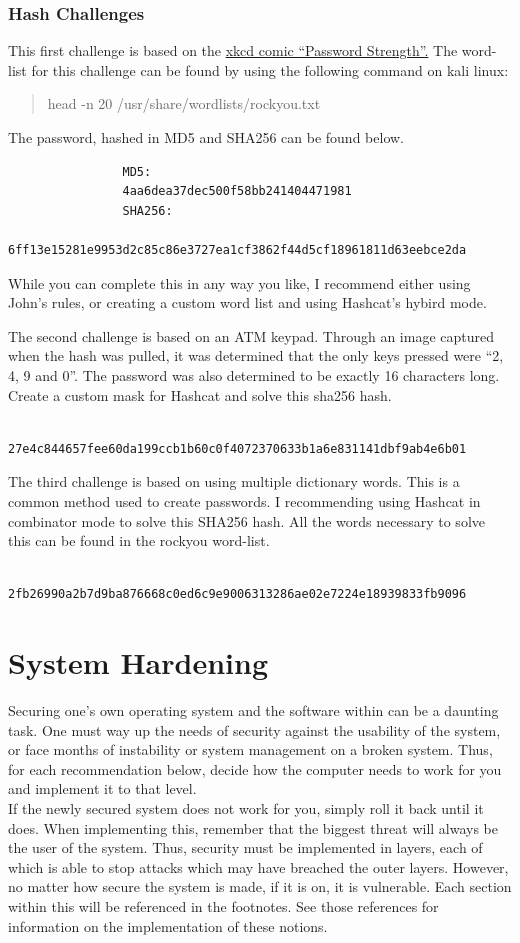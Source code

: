 \documentclass[a4paper,11pt]{report}
\begin{document}
		\subsection{Hash Challenges}
			This first challenge is based on the \href{https://xkcd.com/936/}{xkcd comic ``Password Strength''.}
			The word-list for this challenge can be found by using the following command on kali linux:
			\begin{quote}
				head -n 20 /usr/share/wordlists/rockyou.txt
			\end{quote}
			The password, hashed in MD5 and SHA256 can be found below. 
			\begin{verbatim}
				MD5: 
				4aa6dea37dec500f58bb241404471981
				SHA256: 
				6ff13e15281e9953d2c85c86e3727ea1cf3862f44d5cf18961811d63eebce2da 
			\end{verbatim}
			While you can complete this in any way you like, I recommend either using John's rules, or creating a custom word list and using Hashcat's hybird mode. 

			The second challenge is based on an ATM keypad. 
			Through an image captured when the hash was pulled, it was determined that the only keys pressed were ``2, 4, 9 and 0''. 
			The password was also determined to be exactly 16 characters long. 
			Create a custom mask for Hashcat and solve this sha256 hash. 
			\begin{verbatim}
				27e4c844657fee60da199ccb1b60c0f4072370633b1a6e831141dbf9ab4e6b01
			\end{verbatim}

			The third challenge is based on using multiple dictionary words. 
			This is a common method used to create passwords. 
			I recommending using Hashcat in combinator mode to solve this SHA256 hash. 
			All the words necessary to solve this can be found in the rockyou word-list. 
			\begin{verbatim}
				2fb26990a2b7d9ba876668c0ed6c9e9006313286ae02e7224e18939833fb9096
			\end{verbatim}
\chapter{System Hardening}
	\label{ch:SystemHardening}
	Securing one's own operating system and the software within can be a daunting task. 
	One must way up the needs of security against the usability of the system, or face months of instability or system management on a broken system. 
	Thus, for each recommendation below, decide how the computer needs to work for you and implement it to that level.\\ 
	If the newly secured system does not work for you, simply roll it back until it does. 
	When implementing this, remember that the biggest threat will always be the user of the system. 
	Thus, security must be implemented in layers, each of which is able to stop attacks which may have breached the outer layers. However, no matter how secure the system is made, if it is on, it is vulnerable. 
	Each section within this will be referenced in the footnotes. See those references for information on the implementation of these notions. 
\end{document}
